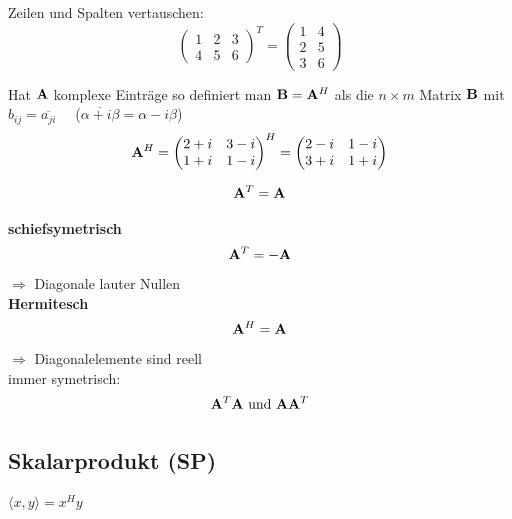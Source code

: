 		\begin{fdef}[Normalfall $\mA^T$]
		
			Zeilen und Spalten vertauschen:
			\[
				\begin{pmatrix}
				        1 & 2 & 3\\
				        4 & 5 & 6
				\end{pmatrix}^T
				= 
				\begin{pmatrix}
					1 & 4\\
					2 & 5\\
					3 & 6
				\end{pmatrix}
			\]
			
		\end{fdef}
		
		\begin{fdef}
		
			Hat $\mathbf{A}$ komplexe Einträge so definiert man $\mathbf{B}=\mathbf{A}^H$ als die $n\times m$
			Matrix $\mathbf{B}$ mit $b_{ij} = \overline{a_{ji}} \quad$  
			($\overline{\alpha + i \beta} = \alpha - i \beta$)
			\[
				\mathbf{A}^H = 
				\begin{pmatrix}
					2+i & 3-i \\
					1+i & 1-i
				\end{pmatrix}^H
				=
				\begin{pmatrix}
					2-i & 1-i \\
					3+i & 1+i
				\end{pmatrix}
			\]
		\end{fdef}
			
		\begin{fsubdef}[symetrisch]
			\[
				\mathbf{A}^T = \mathbf{A}
			\]
			
			\textbf{schiefsymetrisch}
			\[
				\mathbf{A}^T = -\mathbf{A}
			\]
			$\Rightarrow$ Diagonale lauter Nullen \\
			
			\textbf{Hermitesch}
			\[
				\mathbf{A}^H = \mathbf{A}
			\]
			$\Rightarrow$ Diagonalelemente sind reell \\
			
			immer symetrisch:
			\[
				\mathbf{A}^T \mathbf{A} \text{ und } \mathbf{A} \mathbf{A}^T
			\]
			
		\end{fsubdef}

	\subsection{Skalarprodukt (SP)}
	
		\begin{fdef}
			$\langle x,y \rangle = x^H y$
		\end{fdef}
		
